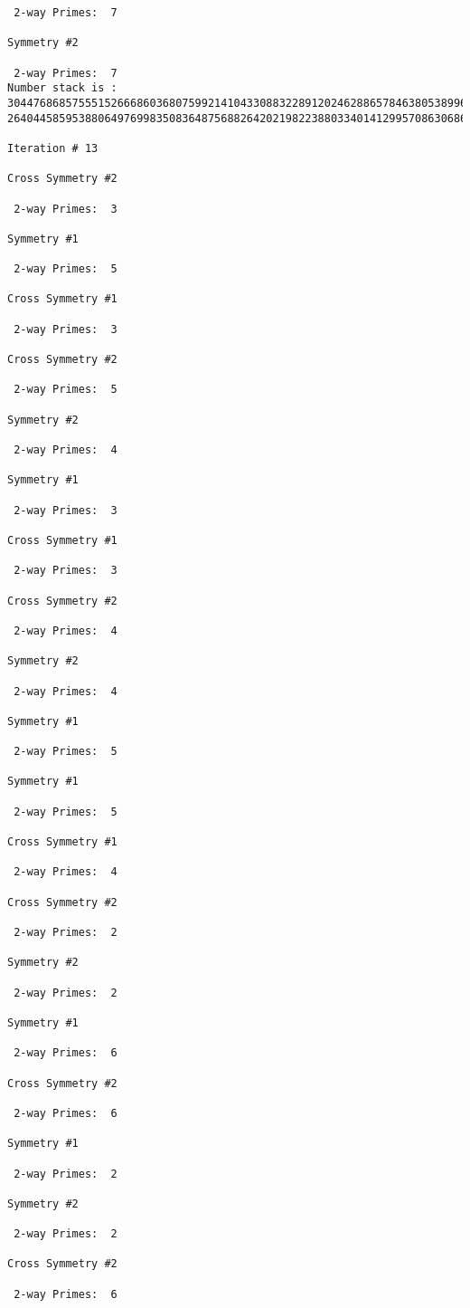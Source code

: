 {{{{\begin{verbatim}
 2-way Primes: 	7

Symmetry #2

 2-way Primes: 	7
Number stack is :
30447686857555152666860368075992141043308832289120246288657846380538996794608835958544046240163340857
26404458595388064976998350836487568826420219822388033401412995708630686662515557586867440375804336104

Iteration #	13

Cross Symmetry #2

 2-way Primes: 	3

Symmetry #1

 2-way Primes: 	5

Cross Symmetry #1

 2-way Primes: 	3

Cross Symmetry #2

 2-way Primes: 	5

Symmetry #2

 2-way Primes: 	4

Symmetry #1

 2-way Primes: 	3

Cross Symmetry #1

 2-way Primes: 	3

Cross Symmetry #2

 2-way Primes: 	4

Symmetry #2

 2-way Primes: 	4

Symmetry #1

 2-way Primes: 	5

Symmetry #1

 2-way Primes: 	5

Cross Symmetry #1

 2-way Primes: 	4

Cross Symmetry #2

 2-way Primes: 	2

Symmetry #2

 2-way Primes: 	2

Symmetry #1

 2-way Primes: 	6

Cross Symmetry #2

 2-way Primes: 	6

Symmetry #1

 2-way Primes: 	2

Symmetry #2

 2-way Primes: 	2

Cross Symmetry #2

 2-way Primes: 	6


\end{verbatim}}}}}
